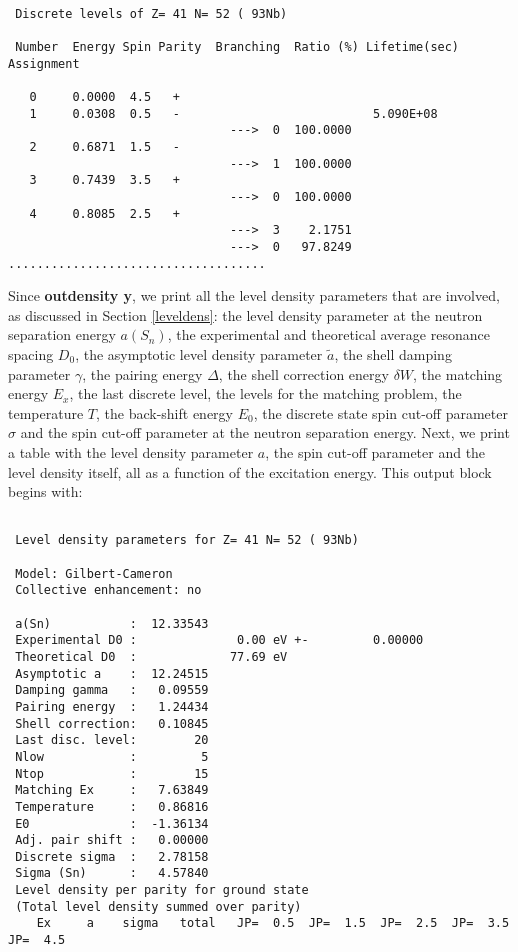\begin{samplecase}
{\small \begin{verbatim}

 Discrete levels of Z= 41 N= 52 ( 93Nb) 

 Number  Energy Spin Parity  Branching  Ratio (%) Lifetime(sec) Assignment      

   0     0.0000  4.5   +                                                        
   1     0.0308  0.5   -                           5.090E+08                    
                               --->  0  100.0000                   
   2     0.6871  1.5   -                                                        
                               --->  1  100.0000                   
   3     0.7439  3.5   +                                                        
                               --->  0  100.0000                   
   4     0.8085  2.5   +                                                        
                               --->  3    2.1751
                               --->  0   97.8249
....................................
\end{verbatim} } \renewcommand{\baselinestretch}{1.07}\small\normalsize
\noindent
Since {\bf outdensity y}, we print all the level density parameters that are 
involved, as 
discussed in Section \ref{leveldens}: the level density parameter at the 
neutron separation energy $a(S_{n})$, the experimental and theoretical average 
resonance spacing $D_{0}$, the asymptotic level density parameter 
$\tilde{a}$, the shell damping parameter $\gamma$, the pairing energy $\Delta$, 
the shell correction energy $\delta W$, the matching energy $E_{x}$, the last 
discrete level, the levels for the matching problem, the temperature $T$, the 
back-shift energy $E_{0}$, the discrete state spin cut-off parameter 
$\sigma$ and the spin cut-off parameter at the neutron separation energy.
Next, we print a table with the level density parameter $a$, the spin cut-off 
parameter and the level density itself, all as a function of the excitation 
energy. This output block begins with:

{\small \begin{verbatim}

 Level density parameters for Z= 41 N= 52 ( 93Nb)
                                
 Model: Gilbert-Cameron    
 Collective enhancement: no
 
 a(Sn)           :  12.33543
 Experimental D0 :              0.00 eV +-         0.00000
 Theoretical D0  :             77.69 eV 
 Asymptotic a    :  12.24515
 Damping gamma   :   0.09559 
 Pairing energy  :   1.24434
 Shell correction:   0.10845
 Last disc. level:        20
 Nlow            :         5
 Ntop            :        15                       
 Matching Ex     :   7.63849
 Temperature     :   0.86816
 E0              :  -1.36134                                                    
 Adj. pair shift :   0.00000
 Discrete sigma  :   2.78158   
 Sigma (Sn)      :   4.57840                                                    
 Level density per parity for ground state
 (Total level density summed over parity)                                       
    Ex     a    sigma   total   JP=  0.5  JP=  1.5  JP=  2.5  JP=  3.5  JP=  4.5


\end{verbatim}}
\end{samplecase}

